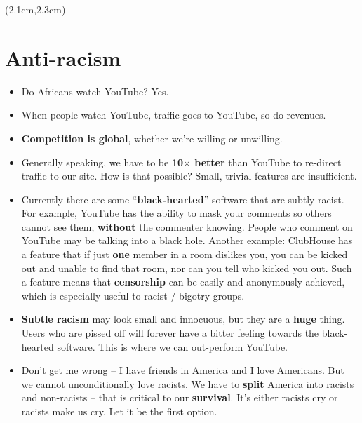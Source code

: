 \begin{preview}
\begin{textblock*}{5cm}(2.1cm,2.3cm) %
{\color{red}{\large \textcircled{\small \themypage}}}
\addtocounter{mypage}{1}
\end{textblock*}

\begin{minipage}{\textwidth}
\setlength{\parskip}{0.4\baselineskip}

\section{Anti-racism}

\begin{itemize}
	\item Do Africans watch YouTube?  Yes.
	\item When people watch YouTube, traffic goes to YouTube, so do revenues.
	\item \textbf{Competition is global}, whether we're willing or unwilling.
	\item Generally speaking, we have to be \textbf{10$\times$ better} than YouTube to re-direct traffic to our site.  How is that possible?  Small, trivial features are insufficient.
	\item Currently there are some ``\textbf{black-hearted}'' software that are subtly racist.  For example, YouTube has the ability to mask your comments so others cannot see them, \textbf{without} the commenter knowing.  People who comment on YouTube may be talking into a black hole.  Another example:  ClubHouse has a feature that if just \textbf{one} member in a room dislikes you, you can be kicked out and unable to find that room, nor can you tell who kicked you out.  Such a feature means that \textbf{censorship} can be easily and anonymously achieved, which is especially useful to racist / bigotry groups.
	\item \textbf{Subtle racism} may look small and innocuous, but they are a \textbf{huge} thing.  Users who are pissed off will forever have a bitter feeling towards the black-hearted software.  This is where we can out-perform YouTube.
	\item Don't get me wrong -- I have friends in America and I love Americans.  But we cannot unconditionally love racists.  We have to \textbf{split} America into racists and non-racists -- that is critical to our \textbf{survival}.  It's either racists cry or racists make us cry.  Let it be the first option.

\end{itemize}
\end{minipage}
\end{preview}

